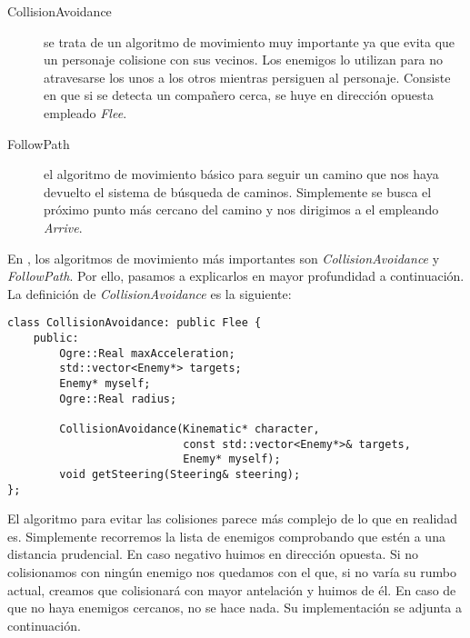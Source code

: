 \begin{description}
    \item [CollisionAvoidance] se trata de un algoritmo de movimiento muy
    importante ya que evita que un personaje colisione con sus vecinos. Los
    enemigos lo utilizan para no atravesarse los unos a los otros mientras
    persiguen al personaje. Consiste en que si se detecta un compañero cerca,
    se huye en dirección opuesta empleado \textit{Flee}.
    
    \item [FollowPath] el algoritmo de movimiento básico para seguir un camino
    que nos haya devuelto el sistema de búsqueda de caminos. Simplemente
    se busca el próximo punto más cercano del camino y nos dirigimos a el
    empleando \textit{Arrive}.
\end{description}

En \juego, los algoritmos de movimiento más importantes son \textit{CollisionAvoidance}
y \textit{FollowPath}. Por ello, pasamos a explicarlos en mayor profundidad 
a continuación. La definición de \textit{CollisionAvoidance} es la siguiente:\\

\begin{lstlisting}[style=C++]
class CollisionAvoidance: public Flee {
    public:
        Ogre::Real maxAcceleration;
        std::vector<Enemy*> targets;
        Enemy* myself;
        Ogre::Real radius;
        
        CollisionAvoidance(Kinematic* character,
                           const std::vector<Enemy*>& targets,
                           Enemy* myself);
        void getSteering(Steering& steering); 
};
\end{lstlisting}

El algoritmo para evitar las colisiones parece más complejo de lo que en realidad
es. Simplemente recorremos la lista de enemigos comprobando que estén a
una distancia prudencial. En caso negativo huimos en dirección opuesta. 
Si no colisionamos con ningún enemigo nos quedamos con el que, si no varía
su rumbo actual, creamos que colisionará con mayor antelación y huimos de él.
En caso de que no haya enemigos cercanos, no se hace nada. Su implementación
se adjunta a continuación.\\


